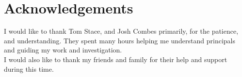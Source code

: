\chapter{Acknowledgements}

I would like to thank Tom Stace, and Josh Combes primarily, for the patience, and understanding. They spent many hours helping me understand principals and guiding my work and investigation. \\
I would also like to thank my friends and family for their help and support during this time. 